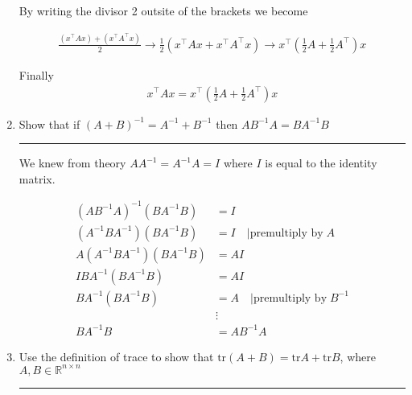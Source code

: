 \documentclass[12pt]{article}
\begin{document}
\begin{enumerate}
    By writing the divisor 2 outsite of the brackets we become

    \begin{align*}
        \frac{(x^\intercal Ax) + (x^\intercal A^\intercal x)}{2} \rightarrow 
        \frac{1}{2} (x^\intercal Ax + x^\intercal A^\intercal x) \rightarrow 
         x^\intercal ( \frac{1}{2} A + \frac{1}{2} A^\intercal ) x
    \end{align*}

    Finally
    \begin{align*}
        x^\intercal Ax = x^\intercal ( \frac{1}{2} A + \frac{1}{2} A^\intercal ) x
    \end{align*}


    \item Show that if $(A + B)^{-1} = A^{-1} + B^{-1}$ then $A B^{-1} A = B A^{-1} B$
    
    \noindent\rule{\linewidth}{1pt}

    We knew from theory $A A^{-1} = A^{-1} A = I$ where $I$ is equal to the identity matrix.

    \begin{align*}
        (A B^{-1} A)^{-1} (B A^{-1} B) &= I \\
        (A^{-1}  B A^{-1} ) (B A^{-1} B) &= I \quad | \textrm{premultiply by} \; A \\
        A (A^{-1}  B A^{-1} ) (B A^{-1} B) &= A I\\
        I B A^{-1} (B A^{-1} B) &= A I\\
         B A^{-1} (B A^{-1} B) &= A \quad | \textrm{premultiply by} \; B^{-1}  \\
         &\vdots \\
         B A^{-1} B &= A B^{-1} A
    \end{align*}

    \item Use the definition of trace to show that $\textrm{tr}(A + B) = \textrm{tr}A + \textrm{tr}B$, where $A, B \in \mathbb{R}^{n \times n}$
    
    \noindent\rule{\linewidth}{1pt}


\end{enumerate}
\end{document}
